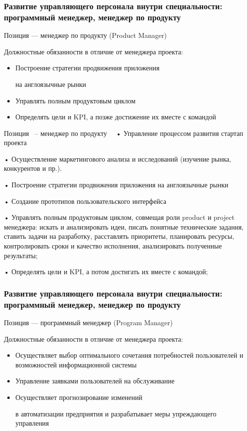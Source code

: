 \documentclass{../industrial-development}
\begin{document}
\begin{frame} \frametitle{Развитие управляющего персонала внутри специальности:  программный менеджер, менеджер по продукту}
 \begin{block}{}
  \alert{Позиция --- менеджер по продукту (Product Manager)}

Должностные обязанности в отличие от менеджера проекта: 
  \end{block}
  \begin{itemize}
  \item Построение стратегии продвижения приложения 

на англоязычные рынки
  \item Управлять полным продуктовым циклом
 \item Определять цели и KPI, а позже достижение их вместе с командой
  \end{itemize}
\end{frame}

\lecturenotes

Позиция~\cite{hh} – менеджер по продукту~\cite{itcf}~\cite{rab}
•	Управление процессом развития стартап проекта 

•	Осуществление маркетингового анализа и исследований (изучение рынка, конкурентов и пр.).

•	Построение стратегии продвижения приложения на англоязычные рынки

•	Создание прототипов пользовательского интерфейса 

•	Управлять полным продуктовым циклом, совмещая роли product и project менеджера: искать и анализировать идеи, писать понятные технические задания, ставить задачи на разработку, расставлять приоритеты, планировать ресурсы, контролировать сроки и качество исполнения, анализировать полученные результаты;

•	Определять цели и KPI, а потом достигать их вместе с командой;



\begin{frame} \frametitle{Развитие управляющего персонала внутри специальности:  программный менеджер,  менеджер по продукту}
 \begin{block}{}
  \alert{Позиция --- программный менеджер (Program Manager)}

Должностные обязанности в отличие от менеджера проекта: 
  \end{block}
  \begin{itemize}
  \item Осуществляет выбор оптимального сочетания потребностей пользователей и возможностей информационной системы
 \item Управление заявками пользователей на обслуживание
 \item Осуществляет прогнозирование изменений 

в автоматизации предприятия и разрабатывает меры упреждающего управления
  \end{itemize}
\end{frame}
\end{document}
